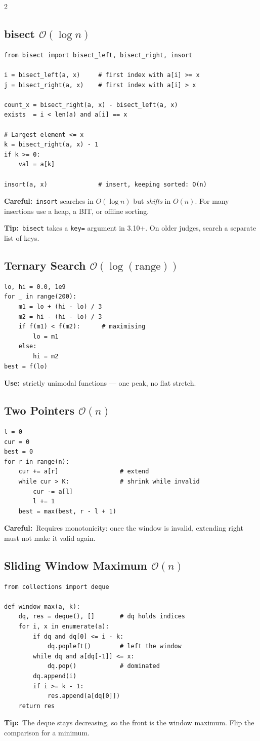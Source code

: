 \documentclass[10pt]{article}
\newcommand{\code}[1]{\texttt{\small #1}}
\newcommand{\sub}[2]{\subsection[#1]{#1\hspace{0.6em}%
  \textnormal{\color{accent2}\small$\mathcal{O}(#2)$}}}
\newcommand{\uses}[1]{{\color{accent2}\footnotesize\textbf{Use:}}~{\footnotesize #1}\par}
\newcommand{\tip}[1]{{\color{tipc}\footnotesize\textbf{Tip:}}~{\footnotesize #1}\par}
\newcommand{\warn}[1]{{\color{warnc}\footnotesize\textbf{Careful:}}~{\footnotesize #1}\par}
\begin{document}
\begin{multicols}{2}
\sub{bisect}{\log n}
\begin{lstlisting}
from bisect import bisect_left, bisect_right, insort

i = bisect_left(a, x)     # first index with a[i] >= x
j = bisect_right(a, x)    # first index with a[i] > x

count_x = bisect_right(a, x) - bisect_left(a, x)
exists  = i < len(a) and a[i] == x

# Largest element <= x
k = bisect_right(a, x) - 1
if k >= 0:
    val = a[k]

insort(a, x)              # insert, keeping sorted: O(n)
\end{lstlisting}
\warn{\code{insort} searches in $O(\log n)$ but \emph{shifts} in $O(n)$.
For many insertions use a heap, a BIT, or offline sorting.}
\tip{\code{bisect} takes a \code{key=} argument in 3.10+. On older
judges, search a separate list of keys.}

\sub{Ternary Search}{\log(\text{range})}
\begin{lstlisting}
lo, hi = 0.0, 1e9
for _ in range(200):
    m1 = lo + (hi - lo) / 3
    m2 = hi - (hi - lo) / 3
    if f(m1) < f(m2):      # maximising
        lo = m1
    else:
        hi = m2
best = f(lo)
\end{lstlisting}
\uses{strictly unimodal functions --- one peak, no flat stretch.}

\sub{Two Pointers}{n}
\begin{lstlisting}
l = 0
cur = 0
best = 0
for r in range(n):
    cur += a[r]                 # extend
    while cur > K:              # shrink while invalid
        cur -= a[l]
        l += 1
    best = max(best, r - l + 1)
\end{lstlisting}
\warn{Requires monotonicity: once the window is invalid, extending right
must not make it valid again.}

\sub{Sliding Window Maximum}{n}
\begin{lstlisting}
from collections import deque

def window_max(a, k):
    dq, res = deque(), []       # dq holds indices
    for i, x in enumerate(a):
        if dq and dq[0] <= i - k:
            dq.popleft()        # left the window
        while dq and a[dq[-1]] <= x:
            dq.pop()            # dominated
        dq.append(i)
        if i >= k - 1:
            res.append(a[dq[0]])
    return res
\end{lstlisting}
\tip{The deque stays decreasing, so the front is the window maximum.
Flip the comparison for a minimum.}


\end{multicols}
\end{document}
